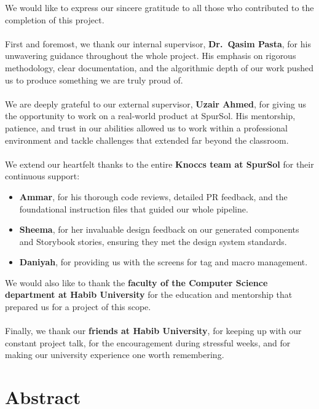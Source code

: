 \documentclass[12pt,twosided]{report}
\begin{document}
We would like to express our sincere gratitude to all those who contributed to the completion of this project.
\\\\
First and foremost, we thank our internal supervisor, \textbf{Dr.\ Qasim Pasta}, for his unwavering guidance throughout the whole project. His emphasis on rigorous methodology, clear documentation, and the algorithmic depth of our work pushed us to produce something we are truly proud of. 
\\\\
We are deeply grateful to our external supervisor, \textbf{Uzair Ahmed}, for giving us the opportunity to work on a real-world product at SpurSol. His mentorship, patience, and trust in our abilities allowed us to work within a professional environment and tackle challenges that extended far beyond the classroom.
\\\\
We extend our heartfelt thanks to the entire \textbf{Knoccs team at SpurSol} for their continuous support:
\begin{itemize}
    \item \textbf{Ammar}, for his thorough code reviews, detailed PR feedback, and the foundational instruction files that guided our whole pipeline.
    \item \textbf{Sheema}, for her invaluable design feedback on our generated components and Storybook stories, ensuring they met the design system standards.
    \item \textbf{Daniyah}, for providing us with the screens for tag and macro management.
\end{itemize}
We would also like to thank the \textbf{faculty of the Computer Science department at Habib University} for the education and mentorship that prepared us for a project of this scope.
\\\\
Finally, we thank our \textbf{friends at Habib University}, for keeping up with our constant project talk, for the encouragement during stressful weeks, and for making our university experience one worth remembering.

\chapter*{Abstract}
\end{document}
